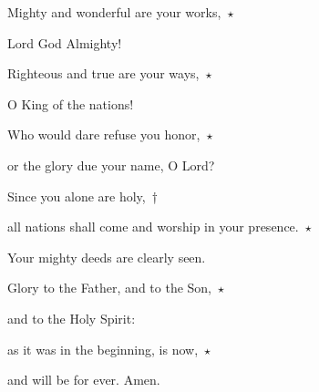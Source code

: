 \noindent Mighty and wonderful are your works,~$\star$~\nopagebreak

Lord God Almighty!

\noindent Righteous and true are your ways,~$\star$~\nopagebreak

O King of the nations!

\noindent Who would dare refuse you honor,~$\star$~\nopagebreak

or the glory due your name, O Lord?

\noindent Since you alone are holy,~†~\nopagebreak

all nations shall come and worship in your presence.~$\star$~\nopagebreak

Your mighty deeds are clearly seen.

\noindent Glory to the Father, and to the Son,~$\star$~\nopagebreak

and to the Holy Spirit:

\noindent as it was in the beginning, is now,~$\star$~\nopagebreak

and will be for ever. Amen.
